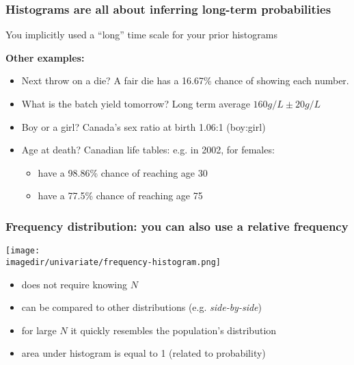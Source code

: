 \begin{frame}\frametitle{Histograms are all about inferring long-term probabilities}
	You implicitly used a ``long'' time scale for your prior histograms

	\vspace{12pt}
	\textbf{Other examples:}
	\begin{itemize}
		\item	Next throw on a die? A fair die has a 16.67\% chance of showing each number.
		\item	What is the batch yield tomorrow? Long term average $160 g/L \pm 20 g/L$
		\item	Boy or a girl? Canada's sex ratio at birth 1.06:1 (boy:girl)
		\item	Age at death? Canadian life tables: e.g. in 2002, for females:
		\begin{itemize}
			\item	have a 98.86\% chance of reaching age 30
			\item	have a 77.5\% chance of reaching age 75
		\end{itemize}
	\end{itemize}
\end{frame}

\begin{frame}\frametitle{Frequency distribution: you can also use a relative frequency}
	\begin{center}
		\texttt{[image: \\imagedir/univariate/frequency-histogram.png]}
	\end{center}
	{}
	\begin{itemize}
		\item	does not require knowing $N$
		\item	can be compared to other distributions (e.g. \emph{side-by-side})
		\item	for large $N$ it quickly resembles the population's distribution
		\item	area under histogram is equal to 1 (related to probability)
	\end{itemize}
\end{frame}

